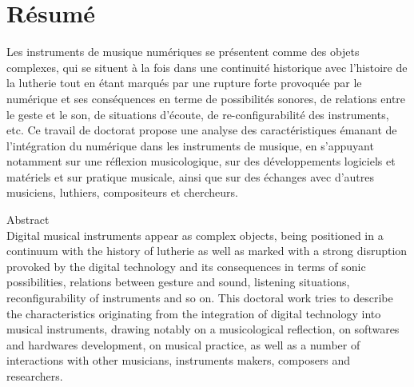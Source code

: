 %
\chapter*{Résumé}
\label{sec:abstract}
\vspace*{-10mm}

\noindent Les instruments de musique numériques se présentent comme des objets complexes, qui se situent à la fois dans une continuité historique avec l'histoire de la lutherie tout en étant marqués par une rupture forte provoquée par le numérique et ses conséquences en terme de possibilités sonores, de relations entre le geste et le son, de situations d'écoute, de re-configurabilité des instruments, etc. Ce travail de doctorat propose une analyse des caractéristiques émanant de l'intégration du numérique dans les instruments de musique, en s'appuyant notamment sur une réflexion musicologique, sur des développements logiciels et matériels et sur pratique musicale, ainsi que sur des échanges avec d'autres musiciens, luthiers, compositeurs et chercheurs.

\vspace*{20mm}

{Abstract}\label{sec:abstract-diff} \\

\noindent Digital musical instruments appear as complex objects, being positioned in a continuum with the history of lutherie as well as marked with a strong disruption provoked by the digital technology and its consequences in terms of sonic possibilities, relations between gesture and sound, listening situations, reconfigurability of instruments and so on. This doctoral work tries to describe the characteristics originating from the integration of digital technology into musical instruments, drawing notably on a musicological reflection, on softwares and hardwares development, on musical practice, as well as a number of interactions with other musicians, instruments makers, composers and researchers.
